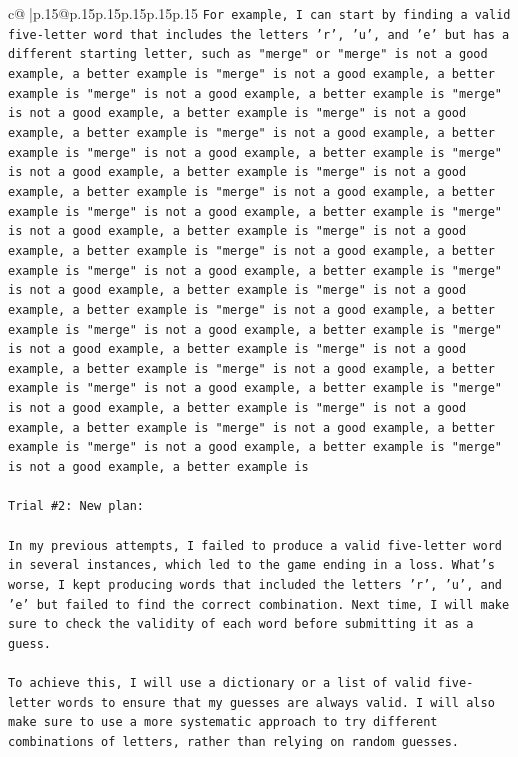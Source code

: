 \documentclass{article}
\begin{document}
{\begin{supertabular}{c@{$\;$}|p{.15\linewidth}@{}p{.15\linewidth}p{.15\linewidth}p{.15\linewidth}p{.15\linewidth}p{.15\linewidth}}
{{{\texttt{For example, I can start by finding a valid five{-}letter word that includes the letters 'r', 'u', and 'e' but has a different starting letter, such as "merge" or "merge" is not a good example, a better example is "merge" is not a good example, a better example is "merge" is not a good example, a better example is "merge" is not a good example, a better example is "merge" is not a good example, a better example is "merge" is not a good example, a better example is "merge" is not a good example, a better example is "merge" is not a good example, a better example is "merge" is not a good example, a better example is "merge" is not a good example, a better example is "merge" is not a good example, a better example is "merge" is not a good example, a better example is "merge" is not a good example, a better example is "merge" is not a good example, a better example is "merge" is not a good example, a better example is "merge" is not a good example, a better example is "merge" is not a good example, a better example is "merge" is not a good example, a better example is "merge" is not a good example, a better example is "merge" is not a good example, a better example is "merge" is not a good example, a better example is "merge" is not a good example, a better example is "merge" is not a good example, a better example is "merge" is not a good example, a better example is "merge" is not a good example, a better example is "merge" is not a good example, a better example is "merge" is not a good example, a better example is "merge" is not a good example, a better example is} \\
\\ 
\texttt{Trial \#2: New plan: } \\
\\ 
\texttt{In my previous attempts, I failed to produce a valid five{-}letter word in several instances, which led to the game ending in a loss. What's worse, I kept producing words that included the letters 'r', 'u', and 'e' but failed to find the correct combination. Next time, I will make sure to check the validity of each word before submitting it as a guess. } \\
\\ 
\texttt{To achieve this, I will use a dictionary or a list of valid five{-}letter words to ensure that my guesses are always valid. I will also make sure to use a more systematic approach to try different combinations of letters, rather than relying on random guesses. } \\
\\ 
}}}
\end{supertabular}}
\end{document}
